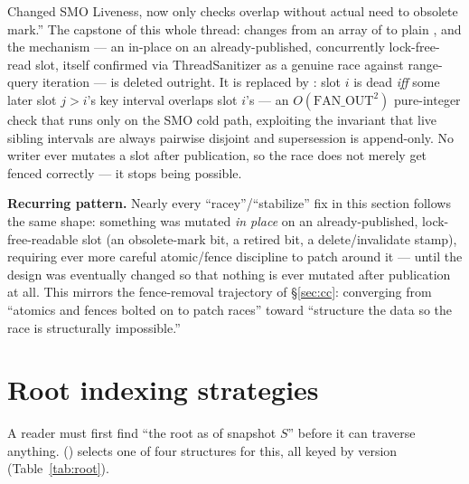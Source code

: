 \documentclass[11pt]{article}
\begin{document}
\begin{itemize}
{        Changed SMO Liveness, now only checks overlap without actual need to obsolete
        mark.''} The capstone of this whole thread: 
        changes from an array of  to plain , and the
         mechanism --- an in-place  on an
        already-published, concurrently lock-free-read slot, itself confirmed via
        ThreadSanitizer as a genuine race against range-query iteration --- is deleted
        outright. It is replaced by : slot $i$ is dead
        \emph{iff} some later slot $j > i$'s key interval overlaps slot $i$'s --- an
        $O(\mathrm{FAN\_OUT}^2)$ pure-integer check that runs only on the SMO cold path,
        exploiting the invariant that live sibling intervals are always pairwise
        disjoint and supersession is append-only. No writer ever mutates a slot after
        publication, so the race does not merely get fenced correctly --- it stops being
        possible.
\end{itemize}

\textbf{Recurring pattern.} Nearly every ``racey''/``stabilize'' fix in this section
follows the same shape: something was mutated \emph{in place} on an already-published,
lock-free-readable slot (an obsolete-mark bit, a retired bit, a delete/invalidate stamp),
requiring ever more careful atomic/fence discipline to patch around it --- until the
design was eventually changed so that nothing is ever mutated after publication at all.
This mirrors the fence-removal trajectory of \S\ref{sec:cc}: converging from ``atomics
and fences bolted on to patch races'' toward ``structure the data so the race is
structurally impossible.''

\section{Root indexing strategies}
\label{sec:root}

A reader must first find ``the root as of snapshot $S$'' before it can traverse anything.
 () selects one of four
structures for this, all keyed by version (Table~\ref{tab:root}).
\end{document}
